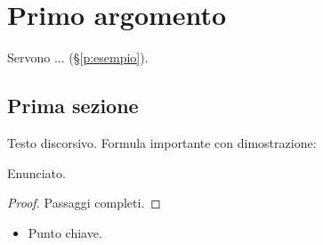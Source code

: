 \chapter{Primo argomento}\label{cap:primo}

\begin{prerequisiti}
Servono ... (\S\ref{p:esempio}).
\end{prerequisiti}

\section{Prima sezione}
Testo discorsivo. Formula importante con dimostrazione:
\begin{proposizione}[Titolo]\label{prop:esempio}
Enunciato.
\end{proposizione}
\begin{proof}
Passaggi completi.
\end{proof}


\begin{riassunto}
\begin{itemize}[nosep]
  \item Punto chiave.
\end{itemize}
\end{riassunto}
